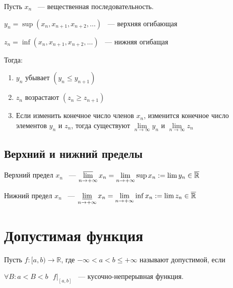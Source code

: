\documentclass{article}
\begin{document}
            Пусть $x_n$ ~--- вещественная последовательность.
            
            $y_n = \sup (x_n, x_{n + 1}, x_{n + 2}, \ldots)$ ~--- верхняя огибающая
            
            $z_n = \inf (x_n, x_{n + 1}, x_{n + 2}, \ldots)$ ~--- нижняя огибащая
            
            Тогда:
            
            \begin{enumerate}
            
                \item $y_n$ убывает $(y_n \leq y_{n + 1})$
                
                \item $z_n$ возрастают $(z_n \geq z_{n + 1})$
            
                \item Если изменить конечное число членов $x_n$, изменится конечное число элементов $y_n$ и $z_n$, тогда существуют $\lim\limits_{n \rightarrow \infty} y_n$ и $\lim\limits_{n \rightarrow \infty} z_n$
            
            \end{enumerate}
            
        \subsection{Верхний и нижний пределы}
        
            Верхний предел $x_n$ ~--- $\varlimsup\limits_{n \rightarrow +\infty} x_n = \lim\limits_{n \rightarrow +\infty} \sup x_n := \lim y_n \in \mathbb{\overline{R}}$
            
            Нижний предел $x_n$ ~--- $\varliminf\limits_{n \rightarrow +\infty} x_n = \lim\limits_{n \rightarrow +\infty} \inf x_n := \lim z_n \in \mathbb{\overline{R}}$
            
    \newpage
    
    \section{Допустимая функция}
    
        Пусть $f : [a, b) \rightarrow \mathbb{R}$, где $-\infty < a < b \leq +\infty$ называют допустимой, если
        
        $\forall B : a < B < b \ \ \ f|_{[a, b]}$ ~--- кусочно-непрерывная функция.
        
\end{document}
